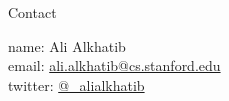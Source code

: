 \documentclass{beamer}
\begin{document}




\begin{frame}{Contact}

    name: {Ali Alkhatib} \\
    email: \href{mailto:ali.alkhatib@cs.stanford.edu}{ali.alkhatib@cs.stanford.edu} \\
    twitter: \href{https://twitter.com/_alialkhatib}{@\_alialkhatib} \\
\end{frame}


% 
\printbibliography{}
\end{document}
